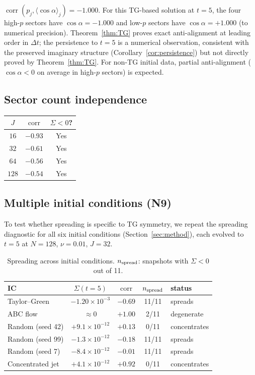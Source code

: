 \documentclass[11pt]{article}
\theoremstyle{definition}
\DeclareMathOperator{\corr}{corr}
\begin{document}
$\corr(p_j,\langle\cos\alpha\rangle_j) = -1.000$.
For this TG-based solution at $t=5$, the four high-$p$
sectors have $\cos\alpha = -1.000$ and low-$p$ sectors
have $\cos\alpha = +1.000$ (to numerical precision).
Theorem~\ref{thm:TG} proves exact anti-alignment at
leading order in $\Delta t$; the persistence to $t=5$
is a numerical observation, consistent with the preserved
imaginary structure (Corollary~\ref{cor:persistence})
but not directly proved by Theorem~\ref{thm:TG}.
For non-TG initial data, partial anti-alignment
($\cos\alpha<0$ on average in high-$p$ sectors)
is expected.

\subsection{Sector count independence}

\begin{center}
\begin{tabular}{@{}ccc@{}}
\toprule
$J$ & $\corr$ & $\Sigma<0$? \\
\midrule
$16$  & $-0.93$ & Yes \\
$32$  & $-0.61$ & Yes \\
$64$  & $-0.56$ & Yes \\
$128$ & $-0.54$ & Yes \\
\bottomrule
\end{tabular}
\end{center}

\subsection{Multiple initial conditions (N9)}
\label{sec:multi-ic}

To test whether spreading is specific to TG symmetry,
we repeat the spreading diagnostic for all six initial
conditions (Section~\ref{sec:method}), each evolved to
$t=5$ at $N=128$, $\nu=0.01$, $J=32$.

\begin{table}[h]
\centering
\caption{Spreading across initial conditions.
$n_{\rm spread}$: snapshots with $\Sigma<0$ out of 11.}
\label{tab:multi-ic}
\begin{tabular}{@{}lcccl@{}}
\toprule
IC & $\Sigma(t\!=\!5)$ & $\corr$ & $n_{\rm spread}$
  & status \\
\midrule
Taylor--Green    & $-1.20\times 10^{-3}$ & $-0.69$ & 11/11
  & spreads \\
ABC flow         & $\approx 0$     & $+1.00$ & 2/11
  & degenerate \\
Random (seed 42) & $+9.1\times 10^{-12}$ & $+0.13$ & 0/11
  & concentrates \\
Random (seed 99) & $-1.3\times 10^{-12}$ & $-0.18$ & 11/11
  & spreads \\
Random (seed 7)  & $-8.4\times 10^{-12}$ & $-0.01$ & 11/11
  & spreads \\
Concentrated jet & $+4.1\times 10^{-12}$ & $+0.92$ & 0/11
  & concentrates \\
\bottomrule
\end{tabular}
\end{table}
\end{document}
